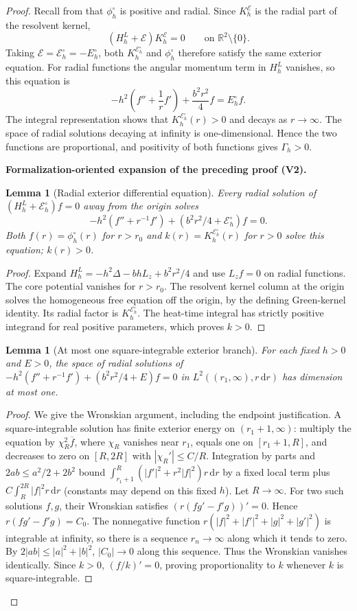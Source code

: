 \documentclass[11pt]{article}
\newtheorem{lemma}[theorem]{Lemma}
\newcommand{\formalisationparentid}{X}
\newenvironment{formalisationaddition}[1]{\par\medskip\begingroup\color{blue}\def\formalisationparentid{#1}\setcounter{formalizationsublemma}{0}\let\lemma\formalizationsublemma\let\endlemma\endformalizationsublemma
  \def\Eo{\mathcal E_h^\circ}\def\EE{\mathcal E_h}\def\phio{\phi_h^\circ}\def\phih{\phi_h}\def\Ho{H_h^{\rm atom}(v^\circ)}\def\Ha{H_h^{\rm atom}}\def\HL{H_h^{L}}\def\Dh{D_h}\def\Log{\operatorname{Log}}\def\ellh{\ell_h}\def\Gp{G_{p,h}}\def\Ast{A_{*,h}}\def\ahat{\widehat{\mathfrak a}_h}\def\ah{\mathfrak a_h}\def\rh{\widehat\rho_h}\def\deltah{\widehat\delta_h}\def\oldref##1{\textup{(##1)}}\def\interface##1{\par\noindent\textit{Analytical interface used here.} ##1\par}\def\finish{\par\noindent\textit{Conclusion of the formalization-oriented expansion.} }\par\noindent\textbf{Formalization-oriented expansion of the preceding proof (V2).}\par\smallskip
}{\par\endgroup\medskip
}
\newcommand{\R}{\mathbb R}
\newcommand{\cE}{\mathcal E}
\begin{document}
\begin{proof}
Recall from  that $\phi_h^\circ$ is positive and radial.  Since $K_h^\cE$ is the radial part of the resolvent kernel,
\[
 (H_h^L+\cE)K_h^\cE=0
 \qquad\text{on }\R^2\setminus\{0\}.
\]
Taking $\cE=\cE_h^\circ=-E_h^\circ$, both $K_h^{\cE_h^\circ}$ and $\phi_h^\circ$ therefore satisfy the same exterior equation.  For radial functions the angular momentum term in $H_h^L$ vanishes, so this equation is
\[
 -h^2\left(f''+\frac1rf'\right)+\frac{b^2r^2}{4}f=E_h^\circ f.
\]
The integral representation  shows that $K_h^{\cE_h^\circ}(r)>0$ and decays as $r\to\infty$.  The space of radial solutions decaying at infinity is one-dimensional.  Hence the two functions are proportional, and positivity of both functions gives $\Gamma_h>0$.

\begin{formalisationaddition}{P2.4}
\begin{lemma}[Radial exterior differential equation]\label{sublemma:P2-4-radial-ode}
Every radial solution of $(\HL+\Eo)f=0$ away from the origin solves
\[
 -h^2(f''+r^{-1}f')+(b^2r^2/4+\Eo)f=0.
\]
Both $f(r)=\phio(r)$ for $r>r_0$ and $k(r)=K_h^{\Eo}(r)$ for $r>0$ solve this equation; $k(r)>0$.
\end{lemma}
\begin{proof}
Expand $\HL=-h^2\Delta-bhL_z+b^2r^2/4$ and use $L_zf=0$ on radial functions. The core potential vanishes for $r>r_0$. The resolvent kernel column at the origin solves the homogeneous free equation off the origin, by the defining Green-kernel identity. Its radial factor is $K_h^{\Eo}$. The heat-time integral has strictly positive integrand for real positive parameters, which proves $k>0$.
\end{proof}

\begin{lemma}[At most one square-integrable exterior branch]\label{sublemma:P2-4-decaying-branch}
For each fixed $h>0$ and $E>0$, the space of radial solutions of
$-h^2(f''+r^{-1}f')+(b^2r^2/4+E)f=0$ in $L^2((r_1,\infty),r\,\mathrm dr)$ has dimension at most one.
\end{lemma}
\begin{proof}
We give the Wronskian argument, including the endpoint justification. A square-integrable solution has finite exterior energy on $(r_1+1,\infty)$: multiply the equation by $\chi_R^2\overline f$, where $\chi_R$ vanishes near $r_1$, equals one on $[r_1+1,R]$, and decreases to zero on $[R,2R]$ with $|\chi_R'|\le C/R$. Integration by parts and $2ab\le a^2/2+2b^2$ bound
$\int_{r_1+1}^R(|f'|^2+r^2|f|^2)r\,\mathrm dr$ by a fixed local term plus $C\int_R^{2R}|f|^2r\,\mathrm dr$ (constants may depend on this fixed $h$). Let $R\to\infty$.
For two such solutions $f,g$, their Wronskian satisfies
$(r(fg'-f'g))'=0$. Hence $r(fg'-f'g)=C_0$.
The nonnegative function $r(|f|^2+|f'|^2+|g|^2+|g'|^2)$ is integrable at infinity, so there is a sequence $r_n\to\infty$ along which it tends to zero. By $2|ab|\le|a|^2+|b|^2$, $|C_0|\to0$ along this sequence. Thus the Wronskian vanishes identically. Since $k>0$, $(f/k)'=0$, proving proportionality to $k$ whenever $k$ is square-integrable.
\end{proof}


\end{formalisationaddition}
\end{proof}
\end{document}
